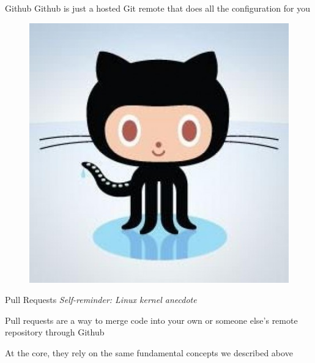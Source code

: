 \documentclass[pdf]{beamer} %
\begin{document}
\begin{frame}[t]{Github}
    Github is just a hosted Git remote that does all the configuration for you
    
    \begin{figure}[htpb]
        \centering
        \includegraphics[width=0.7\linewidth]{fig/octocat}
        \label{fig:octocat}
    \end{figure}
\end{frame}

\begin{frame}[t]{Pull Requests}
    \emph{Self-reminder: Linux kernel anecdote}

    \bigskip
    Pull requests are a way to merge code into your own or someone else's remote repository through Github

    \bigskip
    At the core, they rely on the same fundamental concepts we described above
\end{frame}
\end{document}
